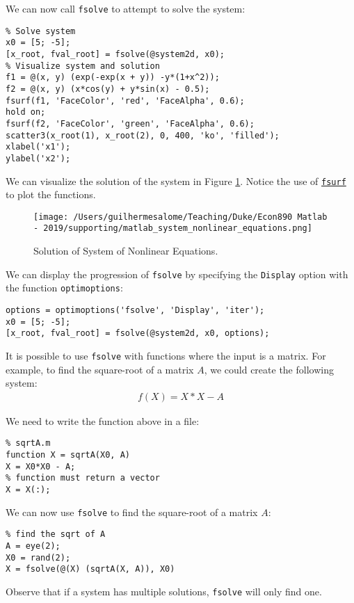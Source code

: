 \documentclass[12pt, a4paper]{article}
\begin{document}
We can now call \texttt{fsolve} to attempt to solve the system:
\lstset{language=matlab,label= ,caption= ,captionpos=b,firstnumber=1,numbers=left,style=Matlab-editor}
\begin{lstlisting}
% Solve system
x0 = [5; -5];
[x_root, fval_root] = fsolve(@system2d, x0);
% Visualize system and solution
f1 = @(x, y) (exp(-exp(x + y)) -y*(1+x^2));
f2 = @(x, y) (x*cos(y) + y*sin(x) - 0.5);
fsurf(f1, 'FaceColor', 'red', 'FaceAlpha', 0.6);
hold on;
fsurf(f2, 'FaceColor', 'green', 'FaceAlpha', 0.6);
scatter3(x_root(1), x_root(2), 0, 400, 'ko', 'filled');
xlabel('x1');
ylabel('x2');
\end{lstlisting}

We can visualize the solution of the system in Figure \ref{fig:orgc1a8959}.
Notice the use of \href{https://www.mathworks.com/help/matlab/ref/fsurf.html}{\texttt{fsurf}} to plot the functions.
\begin{figure}[H]
\centering
\texttt{[image: /Users/guilhermesalome/Teaching/Duke/Econ890 Matlab - 2019/supporting/matlab\_system\_nonlinear\_equations.png]}
\caption{\label{fig:orgc1a8959}
Solution of System of Nonlinear Equations.}
\end{figure}

We can display the progression of \texttt{fsolve} by specifying the \texttt{Display} option with the function \texttt{optimoptions}:
\lstset{language=matlab,label= ,caption= ,captionpos=b,firstnumber=1,numbers=left,style=Matlab-editor}
\begin{lstlisting}
options = optimoptions('fsolve', 'Display', 'iter');
x0 = [5; -5];
[x_root, fval_root] = fsolve(@system2d, x0, options);
\end{lstlisting}

It is possible to use \texttt{fsolve} with functions where the input is a matrix.
For example, to find the square-root of a matrix \(A\), we could create the following system:
\begin{align*}
f(X)=X*X - A
\end{align*}

We need to write the function above in a file:
\lstset{language=matlab,label= ,caption= ,captionpos=b,firstnumber=1,numbers=left,style=Matlab-editor}
\begin{lstlisting}
% sqrtA.m
function X = sqrtA(X0, A)
X = X0*X0 - A;
% function must return a vector
X = X(:);
\end{lstlisting}

We can now use \texttt{fsolve} to find the square-root of a matrix \(A\):
\lstset{language=matlab,label= ,caption= ,captionpos=b,firstnumber=1,numbers=left,style=Matlab-editor}
\begin{lstlisting}
% find the sqrt of A
A = eye(2);
X0 = rand(2);
X = fsolve(@(X) (sqrtA(X, A)), X0)
\end{lstlisting}
Observe that if a system has multiple solutions, \texttt{fsolve} will only find one.
\end{document}
